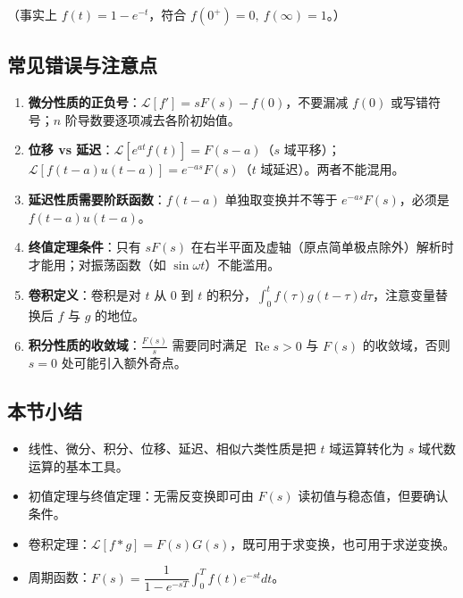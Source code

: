 （事实上 \(f(t)=1-e^{-t}\)，符合 \(f(0^+)=0,\ f(\infty)=1\)。）

\subsection{常见错误与注意点}\label{ux5e38ux89c1ux9519ux8befux4e0eux6ce8ux610fux70b9-22}

\begin{enumerate}
\def\labelenumi{\arabic{enumi}.}
\tightlist
\item
  \textbf{微分性质的正负号}：\(\mathcal{L}[f']=sF(s)-f(0)\)，不要漏减
  \(f(0)\) 或写错符号；\(n\) 阶导数要逐项减去各阶初始值。
\item
  \textbf{位移 vs 延迟}：\(\mathcal{L}[e^{at}f(t)]=F(s-a)\)（\(s\)
  域平移）；\(\mathcal{L}[f(t-a)u(t-a)]=e^{-as}F(s)\)（\(t\)
  域延迟）。两者不能混用。
\item
  \textbf{延迟性质需要阶跃函数}：\(f(t-a)\) 单独取变换并不等于
  \(e^{-as}F(s)\)，必须是 \(f(t-a)u(t-a)\)。
\item
  \textbf{终值定理条件}：只有 \(sF(s)\)
  在右半平面及虚轴（原点简单极点除外）解析时才能用；对振荡函数（如
  \(\sin\omega t\)）不能滥用。
\item
  \textbf{卷积定义}：卷积是对 \(t\) 从 \(0\) 到 \(t\)
  的积分，\(\int_0^t f(\tau)g(t-\tau)d\tau\)，注意变量替换后 \(f\) 与
  \(g\) 的地位。
\item
  \textbf{积分性质的收敛域}：\(\frac{F(s)}{s}\) 需要同时满足
  \(\operatorname{Re}s>0\) 与 \(F(s)\) 的收敛域，否则 \(s=0\)
  处可能引入额外奇点。
\end{enumerate}

\subsection{本节小结}\label{ux672cux8282ux5c0fux7ed3-22}

\begin{itemize}
\tightlist
\item
  线性、微分、积分、位移、延迟、相似六类性质是把 \(t\) 域运算转化为
  \(s\) 域代数运算的基本工具。
\item
  初值定理与终值定理：无需反变换即可由 \(F(s)\)
  读初值与稳态值，但要确认条件。
\item
  卷积定理：\(\mathcal{L}[f*g]=F(s)G(s)\)，既可用于求变换，也可用于求逆变换。
\item
  周期函数：\(F(s)=\dfrac{1}{1-e^{-sT}}\int_0^T f(t)e^{-st}dt\)。
\end{itemize}

